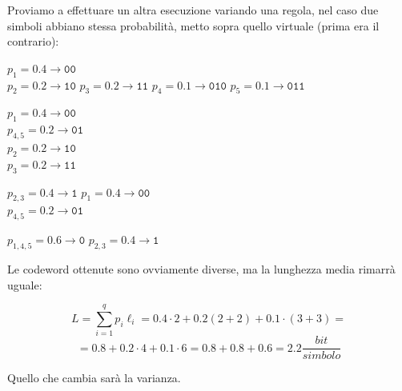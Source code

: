 Proviamo a effettuare un altra esecuzione variando una regola, nel caso due simboli abbiano stessa probabilità, metto sopra quello virtuale (prima era il contrario):
\small{
	\begin{multicols}{4}
		\begin{center}
			$p_1 = 0.4 \rightarrow \texttt{00}$\\
			$p_{2} = 0.2 \rightarrow \texttt{10}$
			$p_{3} = 0.2 \rightarrow \texttt{11}$
			$p_{4} = 0.1 \rightarrow \texttt{010}$
			$p_{5} = 0.1 \rightarrow \texttt{011}$
		\end{center}
		
		\begin{center}
			$p_1 = 0.4 \rightarrow \texttt{00}$\\
			$p_{4,5} = 0.2 \rightarrow \texttt{01}$\\
			$p_{2} = 0.2 \rightarrow \texttt{10}$\\
			$p_{3} = 0.2 \rightarrow \texttt{11}$	
		\end{center}
	
		
		\columnbreak
		
		\begin{center}
			$p_{2,3} = 0.4 \rightarrow \texttt{1}$
			$p_1 = 0.4 \rightarrow \texttt{00}$\\
			$p_{4,5} = 0.2 \rightarrow \texttt{01}$
		\end{center}  
	
		\columnbreak
		
		\begin{center}
			$p_{1,4,5} = 0.6 \rightarrow \texttt{0}$
			$p_{2,3} = 0.4 \rightarrow \texttt{1}$\\
		\end{center}
		
		\columnbreak
	\end{multicols}
}
\normalsize

Le codeword ottenute sono ovviamente diverse, ma la lunghezza media rimarrà uguale:

\begin{equation*}
L = \sum_{i=1}^qp_i\ell_i = 0.4 \cdot 2 + 0.2 (2+2) + 0.1 \cdot (3+3) = 
\end{equation*}
\begin{equation*}
= 0.8 + 0.2 \cdot 4 + 0.1 \cdot 6 = 0.8 +0.8+0.6 = 2.2\frac{bit}{simbolo}
\end{equation*}

Quello che cambia sarà la varianza.






